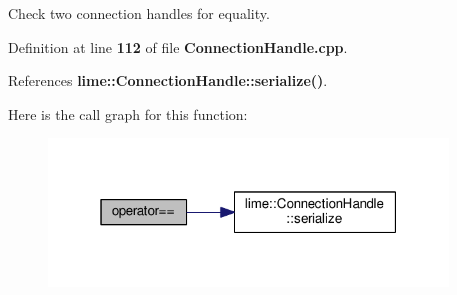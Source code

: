 Check two connection handles for equality. 



Definition at line {\bf 112} of file {\bf Connection\+Handle.\+cpp}.



References {\bf lime\+::\+Connection\+Handle\+::serialize()}.



Here is the call graph for this function\+:
\nopagebreak
\begin{figure}[H]
\begin{center}
\leavevmode
\includegraphics[width=301pt]{d1/d5d/ConnectionHandle_8h_abdcdfe84badb52abc8fd69403bc8d949_cgraph}
\end{center}
\end{figure}


